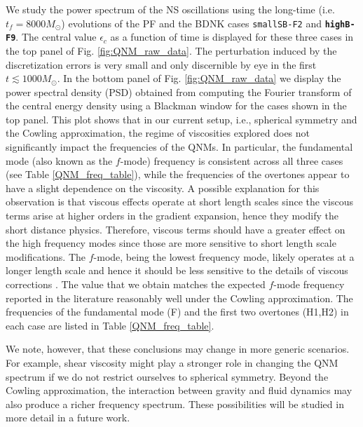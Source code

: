 \documentclass[prd,aps,twocolumn,floats,floatfix,nofootinbib,superscriptaddress] {revtex4-1}
\begin{document}
We study the power spectrum of the NS oscillations using the long-time (i.e. $t_f=8000 M_\odot$) evolutions of the PF and the BDNK cases \texttt{smallSB-F2} and \textbf{\texttt{highB-F9}}. The central value $\epsilon_c$ as a function of time is displayed for these three cases in the top panel of Fig. \ref{fig:QNM_raw_data}. The perturbation induced by the discretization errors is very small and only discernible by eye in the first $t\lesssim 1000 M_\odot$. In the bottom panel of Fig. \ref{fig:QNM_raw_data} we display the power spectral density (PSD) obtained from computing the Fourier transform of the central energy density using a Blackman window for the cases shown in the top panel. 
This plot shows that in our current setup, i.e., spherical symmetry and the Cowling approximation, the regime of viscosities explored does not significantly impact the frequencies of the QNMs.  In particular, the fundamental mode (also known as the $f$-mode) frequency is consistent across all three cases (see Table \ref{QNM_freq_table}), while the frequencies of the overtones appear to have a slight dependence on the viscosity.  A possible explanation for this observation is that viscous effects operate at short length scales since the viscous terms arise at higher orders in the gradient expansion, hence they modify the short distance physics. Therefore, viscous terms should have a greater effect on the high frequency modes since those are more sensitive to short length scale modifications.  The $f$-mode, being the lowest frequency mode, likely operates at a longer length scale and hence it should be less sensitive to the details of viscous corrections \cite{Luis_comment}. 
The value that we obtain matches the expected $f$-mode frequency reported in the literature \cite{Thierfelder:2011yi,Font:2001ew} reasonably well under the Cowling approximation. The frequencies of the fundamental mode (F) and the first two overtones (H1,H2) in each case are listed in Table \ref{QNM_freq_table}.

We note, however, that these conclusions may change in more generic scenarios.  For example, shear viscosity might play a stronger role in changing the QNM spectrum if we do not restrict ourselves to spherical symmetry. Beyond the Cowling approximation, the interaction between gravity and fluid dynamics may also produce a richer frequency spectrum.  These possibilities will be studied in more detail in a future work. 
\end{document}
